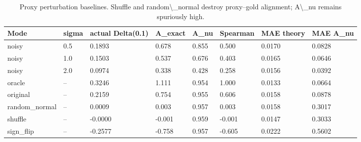 \begin{table}[t]
\centering
\small
\begin{tabular}{llllllll}
\toprule
Mode & sigma & actual Delta(0.1) & A\_exact & A\_nu & Spearman & MAE theory & MAE A\_nu \\
\midrule
noisy & 0.5 & 0.1893 & 0.678 & 0.855 & 0.500 & 0.0170 & 0.0828 \\
noisy & 1.0 & 0.1503 & 0.537 & 0.676 & 0.403 & 0.0165 & 0.0646 \\
noisy & 2.0 & 0.0974 & 0.338 & 0.428 & 0.258 & 0.0156 & 0.0392 \\
oracle & -- & 0.3246 & 1.111 & 0.954 & 1.000 & 0.0133 & 0.0664 \\
original & -- & 0.2159 & 0.754 & 0.955 & 0.606 & 0.0158 & 0.0878 \\
random\_normal & -- & 0.0009 & 0.003 & 0.957 & 0.003 & 0.0158 & 0.3017 \\
shuffle & -- & -0.0000 & -0.001 & 0.959 & -0.001 & 0.0147 & 0.3033 \\
sign\_flip & -- & -0.2577 & -0.758 & 0.957 & -0.605 & 0.0222 & 0.5602 \\
\bottomrule
\end{tabular}
\vspace{0.25em}
\caption{Proxy perturbation baselines. Shuffle and random\textbackslash{}\_normal destroy proxy--gold alignment; A\textbackslash{}\_nu remains spuriously high.}
\label{tab:proxy-perturbation}
\end{table}

